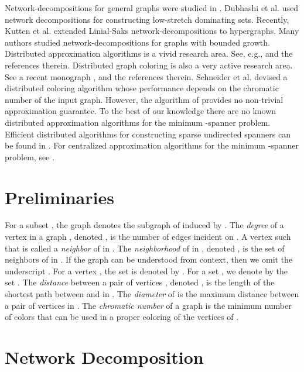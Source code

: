 \documentclass[11pt]{article}
\begin{document}
Network-decompositions for general graphs were studied in \cite{ABCP96,C93,AP90}. Dubhashi et al. \cite{DMPRS05} used network decompositions for constructing low-stretch dominating sets. Recently, Kutten et al. \cite{KNPR14} extended Linial-Saks network-decompositions to hypergraphs.  Many authors \cite{GV07,KMW05,SW08} studied network-decompositions for graphs with bounded growth. Distributed approximation algorithms is a vivid research area. See, e.g., \cite{N14} and the references therein. Distributed graph coloring is also a very active research area. See a recent monograph \cite{BE13}, and the references therein. Schneider et al. \cite{SEW13} devised a distributed coloring algorithm whose performance depends on the chromatic number of the input graph. However, the algorithm of \cite{SEW13} provides no non-trivial approximation guarantee. To the best of our knowledge there are no known distributed approximation algorithms for the minimum -spanner problem. Efficient distributed algorithms for constructing sparse undirected spanners can be found in \cite{E07,DGPV08}. For centralized approximation algorithms for the minimum -spanner problem, see \cite{KP94,EP05,BBMRY11}.   
\section{Preliminaries}  \label{sc:preliminaries}
\noindent For a subset , the graph  denotes the subgraph of  induced by .  The {\em degree} of a vertex  in a graph , denoted {\em }, is the number of edges incident on .  
A vertex  such that  is called a {\em neighbor} of  in . The {\em neighborhood} of  in , denoted , is the set of neighbors of  in . If the graph  can be understood from context, then we omit the underscript . For a vertex , the set  is denoted by . For a set , we denote by  the set . The {\em distance} between a pair of vertices , denoted , is the length of the shortest path between  and  in . 
The {\em diameter} of  is the maximum distance between a pair of vertices in .
The {\em chromatic number}  of a graph  is the minimum number of colors that can be used in a proper coloring of the vertices of . 
\section{Network Decomposition}
\end{document}
